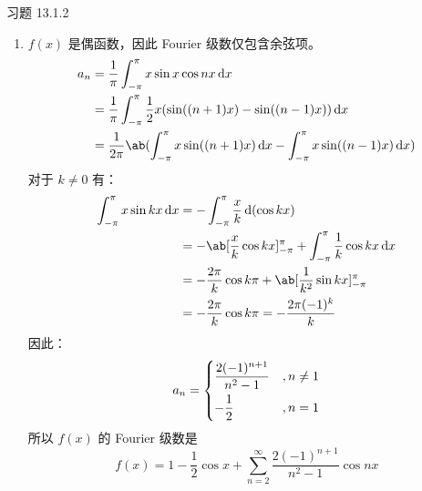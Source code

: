 \begin{problem}
    习题 13.1.2
    \begin{solution}
        \begin{enumerate}
            \item[\textbf{2)}] $f(x)$ 是偶函数，因此 Fourier 级数仅包含余弦项。
            $$
            \begin{aligned}
                a_n & = \frac{1}{\pi} \int_{-\pi}^{\pi} x \sin x \cos nx \dd{x} \\
                & = \frac{1}{\pi} \int_{-\pi}^{\pi} \frac{1}{2} x (\sin ((n + 1) x) - \sin ((n - 1) x)) \dd{x} \\
                & = \frac{1}{2 \pi} \ab(\int_{-\pi}^{\pi} x \sin ((n + 1) x) \dd{x} - \int_{-\pi}^{\pi} x \sin ((n - 1) x) \dd{x})
            \end{aligned}
            $$
            对于 $k \neq 0$ 有：
            $$
            \begin{aligned}
                \int_{-\pi}^{\pi} x \sin k x \dd{x} & = -\int_{-\pi}^{\pi} \frac{x}{k} \dd(\cos k x) \\
                & = -\ab[\frac{x}{k} \cos k x]_{-\pi}^{\pi} + \int_{-\pi}^{\pi} \frac{1}{k} \cos k x \dd{x} \\
                & = -\frac{2\pi}{k} \cos k \pi + \ab[\frac{1}{k^2} \sin k x]_{-\pi}^{\pi} \\
                & = -\frac{2\pi}{k} \cos k \pi = -\frac{2\pi (-1)^{k}}{k}
            \end{aligned}
            $$
            因此：
            $$
            a_n = \begin{dcases}
                \frac{2 (-1)^{n + 1}}{n^2 - 1} & , n \neq 1 \\
                -\frac{1}{2} & , n = 1
            \end{dcases}
            $$
            所以 $f(x)$ 的 Fourier 级数是
            $$
            f(x) = 1 - \frac{1}{2} \cos x + \sum_{n = 2}^{\infty} \frac{2 (-1)^{n + 1}}{n^2 - 1} \cos n x
            $$


\end{enumerate}
\end{solution}
\end{problem}
